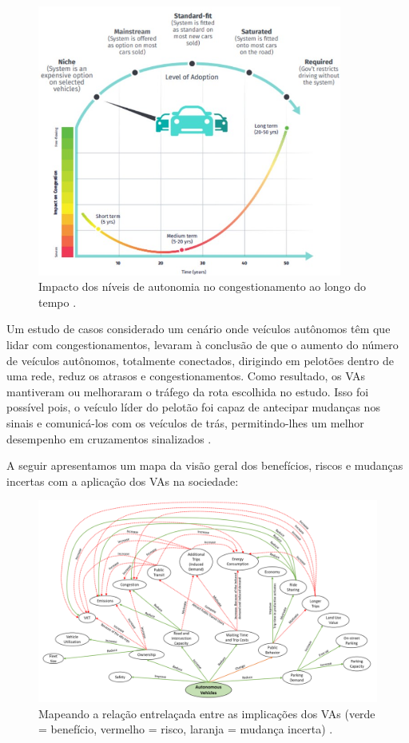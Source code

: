 \begin{figure}[H]
\centering
\includegraphics[width=10cm]{Figures/conge.jpg}
\caption{Impacto dos níveis de autonomia no congestionamento ao longo do tempo \cite{4cenarios_ocidental}.}
\label{congestionamento}
\end{figure}

Um estudo de casos considerado um cenário onde veículos autônomos têm que lidar com congestionamentos, levaram à conclusão de que o aumento do número de veículos autônomos, totalmente conectados, dirigindo em pelotões dentro de uma rede, reduz os atrasos e congestionamentos. Como resultado, os VAs mantiveram ou melhoraram o tráfego da rota escolhida no estudo. Isso foi possível pois, o veículo líder do pelotão foi capaz de antecipar mudanças nos sinais e comunicá-los com os veículos de trás, permitindo-lhes um melhor desempenho em cruzamentos sinalizados \cite{conge}.

A seguir apresentamos um mapa da visão geral dos benefícios, riscos e mudanças incertas com a aplicação dos VAs na sociedade:

\begin{figure}[H]
\centering
\includegraphics[width=16cm]{Figures/map.png}
\caption{Mapeando a relação entrelaçada entre as implicações dos VAs (verde = benefício, vermelho = risco, laranja = mudança incerta) \cite{mundobrasil}.}
\label{mapa_resumo}
\end{figure}


